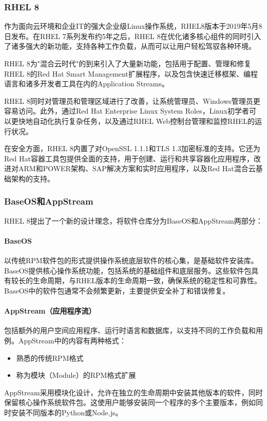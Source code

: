 \documentclass[12pt,UTF8]{ctexbook}
\begin{document}
\subsubsection{RHEL 8}
作为面向云环境和企业IT的强大企业级Linux操作系统，RHEL8版本于2019年5月8日发布。在RHEL 7系列发布约5年之后，RHEL 8在优化诸多核心组件的同时引入了诸多强大的新功能，支持各种工作负载，从而可以让用户轻松驾驭各种环境。

RHEL 8为"混合云时代"的到来引入了大量新功能，包括用于配置、管理和修复RHEL 8的Red Hat Smart Management扩展程序，以及包含快速迁移框架、编程语言和诸多开发者工具在内的Application Streams。

RHEL 8同时对管理员和管理区域进行了改善，让系统管理员、Windows管理员更容易访问。此外，通过Red Hat Enterprise Linux System Roles，Linux初学者可以更快地自动化执行复杂任务，以及通过RHEL Web控制台管理和监控RHEL的运行状况。

在安全方面，RHEL 8内置了对OpenSSL 1.1.1和TLS 1.3加密标准的支持。它还为Red Hat容器工具包提供全面的支持，用于创建、运行和共享容器化应用程序，改进对ARM和POWER架构、SAP解决方案和实时应用程序，以及Red Hat混合云基础架构的支持。

\subsubsection{BaseOS和AppStream}
RHEL 8提出了一个新的设计理念，将软件仓库分为BaseOS和AppStream两部分：

\paragraph{BaseOS}
以传统RPM软件包的形式提供操作系统底层软件的核心集，是基础软件安装库。BaseOS提供核心操作系统功能，包括系统的基础组件和底层服务。这些软件包具有较长的生命周期，与RHEL版本的生命周期一致，确保系统的稳定性和可靠性。BaseOS中的软件包通常不会频繁更新，主要提供安全补丁和错误修复。

\paragraph{AppStream（应用程序流）}
包括额外的用户空间应用程序、运行时语言和数据库，以支持不同的工作负载和用例。AppStream中的内容有两种格式：
\begin{itemize}
    \item 熟悉的传统RPM格式
    \item 称为模块（Module）的RPM格式扩展
\end{itemize}

AppStream采用模块化设计，允许在独立的生命周期中安装其他版本的软件，同时保留核心操作系统软件包。这使用户能够安装同一个程序的多个主要版本，例如同时安装不同版本的Python或Node.js。
\end{document}
